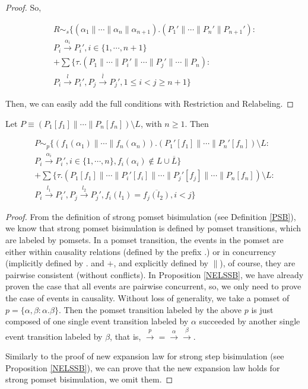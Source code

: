 \begin{proof}
So,

\begin{eqnarray}
R\sim_s \{(\alpha_1\parallel\cdots\parallel \alpha_n\parallel \alpha_{n+1}).(P_1'\parallel\cdots\parallel P_n'\parallel P_{n+1}'): \nonumber\\
P_i\xrightarrow{\alpha_i}P_i',i\in\{1,\cdots,n+1\}\nonumber\\
+\sum\{\tau.(P_1\parallel\cdots\parallel P_i'\parallel\cdots\parallel P_j'\parallel\cdots\parallel P_n): \nonumber\\
P_i\xrightarrow{l}P_i',P_j\xrightarrow{\overline{l}}P_j',1 \leq i<j\geq n+1\} \nonumber
\end{eqnarray}

Then, we can easily add the full conditions with Restriction and Relabeling.

\end{proof}

\begin{proposition}\label{NELSPB}
Let $P\equiv (P_1[f_1]\parallel\cdots\parallel P_n[f_n])\setminus L$, with $n\geq 1$. Then

\begin{eqnarray}
P\sim_p \{(f_1(\alpha_1)\parallel\cdots\parallel f_n(\alpha_n)).(P_1'[f_1]\parallel\cdots\parallel P_n'[f_n])\setminus L: \nonumber\\
P_i\xrightarrow{\alpha_i}P_i',i\in\{1,\cdots,n\},f_i(\alpha_i)\notin L\cup\overline{L}\} \nonumber\\
+\sum\{\tau.(P_1[f_1]\parallel\cdots\parallel P_i'[f_i]\parallel\cdots\parallel P_j'[f_j]\parallel\cdots\parallel P_n[f_n])\setminus L: \nonumber\\
P_i\xrightarrow{l_1}P_i',P_j\xrightarrow{l_2}P_j',f_i(l_1)=\overline{f_j(l_2)},i<j\} \nonumber
\end{eqnarray}
\end{proposition}

\begin{proof}
From the definition of strong pomset bisimulation (see Definition \ref{PSB}), we know that strong pomset bisimulation is defined by pomset transitions, which are labeled by pomsets. In a pomset transition, the events in the pomset are either within causality relations (defined by the prefix $.$) or in concurrency (implicitly defined by $.$ and $+$, and explicitly defined by $\parallel$), of course, they are pairwise consistent (without conflicts). In Proposition \ref{NELSSB}, we have already proven the case that all events are pairwise concurrent, so, we only need to prove the case of events in causality. Without loss of generality, we take a pomset of $p=\{\alpha,\beta:\alpha.\beta\}$. Then the pomset transition labeled by the above $p$ is just composed of one single event transition labeled by $\alpha$ succeeded by another single event transition labeled by $\beta$, that is, $\xrightarrow{p}=\xrightarrow{\alpha}\xrightarrow{\beta}$.

Similarly to the proof of new expansion law for strong step bisimulation (see Proposition \ref{NELSSB}), we can prove that the new expansion law holds for strong pomset bisimulation, we omit them.
\end{proof}


